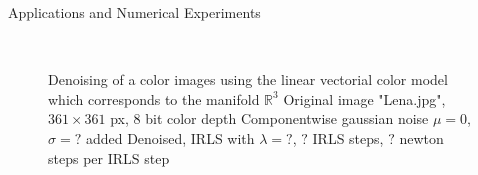 \begin{chapter}{Applications and Numerical Experiments}
\begin{figure}[h!]
    \centering
    \\
    \caption[Denoising linear vectorial]{Denoising of a color images using the linear vectorial color model which corresponds to the manifold $\mathbb{R}^3$
	 Original image "Lena.jpg", $361\times 361$ px, 8 bit color depth
	 Componentwise gaussian noise $\mu=0$, $\sigma=?$ added
	 Denoised, IRLS with $\lambda=?$, $?$ IRLS steps, $?$ newton steps per IRLS step
	\label{fig:application_color1}
    }
\end{figure}


\end{chapter}
